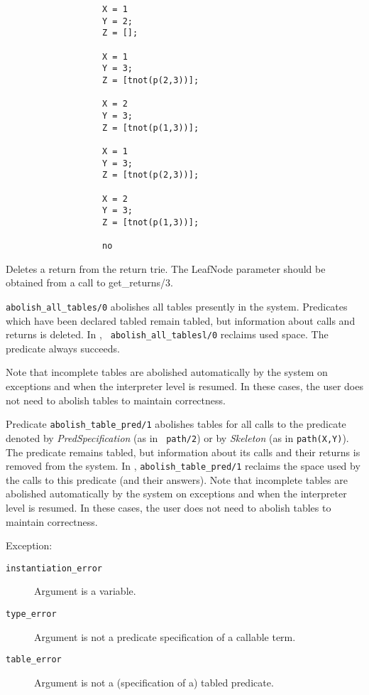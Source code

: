\begin{description}
{\begin{verbatim}
                   X = 1
                   Y = 2;
                   Z = [];

                   X = 1
                   Y = 3;
                   Z = [tnot(p(2,3))];

                   X = 2
                   Y = 3;
                   Z = [tnot(p(1,3))];

                   X = 1
                   Y = 3;
                   Z = [tnot(p(2,3))];

                   X = 2
                   Y = 3;
                   Z = [tnot(p(1,3))];

                   no

     \end{verbatim}
     }

Deletes a return from the return trie. The LeafNode parameter should
be obtained from a call to get\_returns/3.


{\tt abolish\_all\_tables/0} abolishes all tables presently in the
system.  Predicates which have been declared tabled remain tabled, but
information about calls and returns is deleted.  In \version, {\tt
abolish\_all\_tablesl/0} reclaims used space.  The predicate always 
succeeds.

Note that incomplete tables are abolished automatically by the system on
exceptions and when the interpreter level is resumed.  In these cases,
the user does not need to abolish tables to maintain correctness.


%
Predicate {\tt abolish\_table\_pred/1} abolishes tables for all calls
to the predicate denoted by {\em PredSpecification} (as in {\tt
path/2}) or by {\em Skeleton} (as in {\tt path(X,Y)}).  The predicate
remains tabled, but information about its calls and their returns is
removed from the system.  In \version, {\tt abolish\_table\_pred/1}
reclaims the space used by the calls to this predicate (and their
answers).  Note that incomplete tables are abolished automatically by
the system on exceptions and when the interpreter level is resumed.
In these cases, the user does not need to abolish tables to maintain
correctness.

Exception:
    \begin{description}
    \item[{\tt instantiation\_error}]
	Argument is a variable.
    \item[{\tt type\_error}]
	Argument is not a predicate specification of a callable term.
    \item[{\tt table\_error}]
        Argument is not a (specification of a) tabled predicate.
    \end{description}



\end{description}
